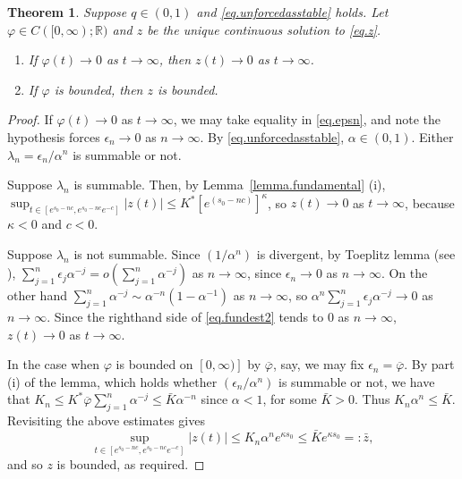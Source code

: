 \documentclass[a4paper,10pt,reqno]{amsart}
\numberwithin{equation}{section}
\newtheorem{theorem}{Theorem}
\theoremstyle{definition}
\theoremstyle{remark}
\DeclareMathOperator{\1}{\mathbbm 1}
\begin{document}
	\begin{theorem} \label{thm.1}
		Suppose $q\in (0,1)$ and \eqref{eq.unforcedasstable} holds. Let $\varphi\in C([0,\infty);\mathbb{R})$ and $z$ be the unique continuous solution to \eqref{eq.z}. 
		\begin{enumerate}
			\item[(a)] If $\varphi(t)\to 0$ as $t\to\infty$, then $z(t)\to 0$ as $t\to\infty$. 
			\item[(b)] If $\varphi$ is bounded, then $z$ is bounded. 
		\end{enumerate}		
	\end{theorem}
	\begin{proof}
		If $\varphi(t)\to 0$ as $t\to\infty$, we may take equality in \eqref{eq.epsn}, and note the hypothesis forces $\epsilon_n\to 0$ as $n\to\infty$. By \eqref{eq.unforcedasstable}, $\alpha\in (0,1)$. Either $\lambda_n=\epsilon_n/\alpha^n$ is summable or not. 
		
		Suppose $\lambda_n$ is summable. Then, by Lemma~\ref{lemma.fundamental} (i),  
		$\sup_{t\in [e^{s_0-nc},e^{s_0-nc}e^{-c}]} |z(t)|\leq K^\ast [e^{(s_0-nc)}]^\kappa$,
		so $z(t)\to 0$ as $t\to\infty$, because $\kappa<0$ and $c<0$. 
		
		Suppose $\lambda_n$ is not summable. Since $(1/\alpha^n)$ is divergent, by Toeplitz lemma (see \cite[p.390]{Shiryaev}), 	$\sum_{j=1}^n \epsilon_j \alpha^{-j} = o\left(\sum_{j=1}^n \alpha^{-j}\right)$ as $n\to\infty$, since $\epsilon_n\to 0$ as $n\to\infty$. On the other hand $\sum_{j=1}^n \alpha^{-j} \sim \alpha^{-n} (1-\alpha^{-1})$ as $n\to\infty$, so $\alpha^n\sum_{j=1}^n \epsilon_j \alpha^{-j}\to 0$ as $n\to\infty$.
		Since the righthand side of \eqref{eq.fundest2} tends to $0$ as $n\to\infty$, $z(t)\to 0$ as $t\to\infty$.  
		
		In the case when $\varphi$ is bounded on $[0,\infty)]$ by $\overline{\varphi}$, say, we may fix $\epsilon_n=\overline{\varphi}$. By part (i) of the lemma, which holds whether $(\epsilon_n/\alpha^n)$ is summable or not, we have that 
		$		K_n\leq K^\ast \overline{\varphi} \sum_{j=1}^n \alpha^{-j} \leq \bar{K} \alpha^{-n}$ 
		since $\alpha<1$, for some $\bar{K}>0$. Thus $K_n \alpha^n\leq \bar{K}$. Revisiting the above estimates gives  
		\[
		\sup_{t\in [e^{s_0-nc},e^{s_0-nc}e^{-c}]} |z(t)|\leq K_n \alpha^n  e^{\kappa s_0}
		\leq \bar{K}e^{\kappa s_0}=:\bar{z},
		\]
		and so $z$ is bounded, as required. 
	\end{proof}
\end{document}
